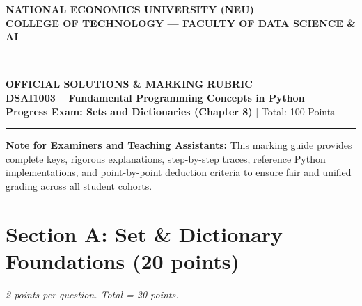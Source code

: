 \documentclass[11pt,a4paper]{article}
\begin{document}
\begin{center}
  {\Large\textbf{NATIONAL ECONOMICS UNIVERSITY (NEU)}}\\[0.1cm]
  {\large\textbf{COLLEGE OF TECHNOLOGY --- FACULTY OF DATA SCIENCE \& AI}}\\[0.2cm]
  \rule{\textwidth}{1pt}\\[0.25cm]
  {\LARGE\bfseries\color{primaryblue}OFFICIAL SOLUTIONS \& MARKING RUBRIC}\\[0.15cm]
  {\large\textbf{DSAI1003 -- Fundamental Programming Concepts in Python}}\\[0.1cm]
  {\normalsize\textbf{Progress Exam: Sets and Dictionaries (Chapter 8)} \quad | \quad Total: 100 Points}\\[0.2cm]
  \rule{\textwidth}{0.5pt}
\end{center}

\begin{tcolorbox}[colback=green!6, colframe=correctgreen, arc=1.5mm]
\small
\textbf{Note for Examiners and Teaching Assistants:}
This marking guide provides complete keys, rigorous explanations, step-by-step traces, reference Python implementations, and point-by-point deduction criteria to ensure fair and unified grading across all student cohorts.
\end{tcolorbox}

\vspace{0.2cm}
\section*{Section A: Set \& Dictionary Foundations (20 points)}
\textit{2 points per question. Total = 20 points.}
\end{document}

